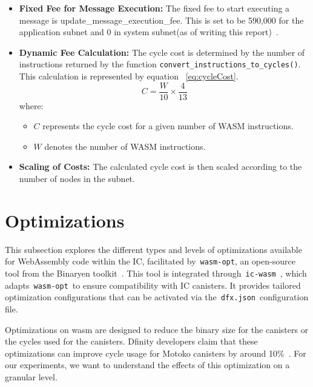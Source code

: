\begin{itemize}
    \item \textbf{Fixed Fee for Message Execution:}
    The fixed fee to start executing a message is {update\_message\_execution\_fee}. This is set to be 590,000 for the application subnet and 0 in system subnet(as of writing this report)~\cite{feeStructure}.
    \item \textbf{Dynamic Fee Calculation:} The cycle cost is determined by the number of instructions returned by the function \texttt{convert\_instructions\_to\_cycles()}. This calculation is represented by equation ~\ref{eq:cycleCost}.
    \begin{equation}
        C = \frac{W}{10} \times \frac{4}{13}
        \label{eq:cycleCost}
        \end{equation}
    where:
    \begin{itemize}
        \item $C$ represents the cycle cost for a given number of WASM instructions.
        \item $W$ denotes the number of WASM instructions.
    \end{itemize}
    \item \textbf{Scaling of Costs:} The calculated cycle cost is then scaled according to the number of nodes in the subnet.
\end{itemize}

    






\section{Optimizations}

This subsection explores the different types and levels of optimizations available for WebAssembly code within the IC, facilitated by \texttt{wasm-opt}, an open-source tool from the Binaryen toolkit~\cite{WebAssemblyBinaryen}. This tool is integrated through \texttt{ic-wasm}~\cite{icwasm}, which adapts \texttt{wasm-opt} to ensure compatibility with IC canisters. It provides tailored optimization configurations that can be activated via the \texttt{dfx.json} configuration file.

Optimizations on wasm are designed to reduce the binary size for the canisters or the cycles used for the canisters. Dfinity developers claim that these optimizations can improve cycle usage for Motoko canisters by around 10\%~\cite{optimization}. For our experiments, we want to understand the effects of this optimization on a granular level.

